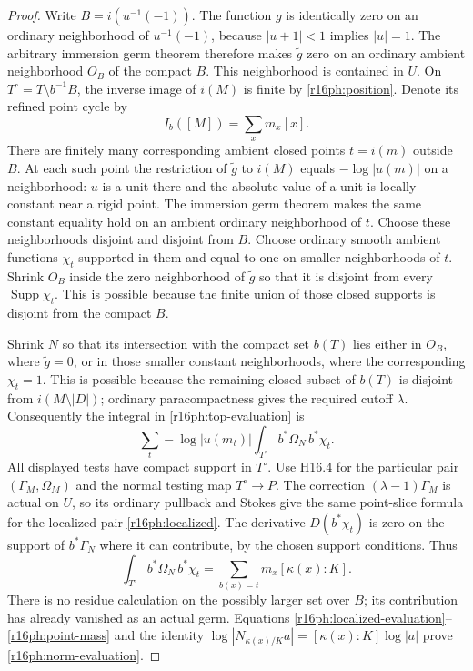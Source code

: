 \begin{proof}
Write $B=i(u^{-1}(-1))$.  The function $g$ is identically zero
on an ordinary neighborhood of $u^{-1}(-1)$, because
$|u+1|<1$ implies $|u|=1$.  The arbitrary immersion germ theorem
therefore makes $\widetilde g$ zero on an ordinary ambient
neighborhood $O_B$ of the compact $B$.  This neighborhood is
contained in $U$.  On
$T^\circ=T\setminus b^{-1}B$, the inverse image of $i(M)$
is finite by \eqref{r16ph:position}.  Denote its refined point
cycle by
\[
                         I_b([M])=\sum_x m_x[x].
 \tag{PH16.6}\label{r16ph:points}
\]
There are finitely many corresponding ambient closed points
$t=i(m)$ outside $B$.  At each such point the restriction of
$\widetilde g$ to $i(M)$ equals $-\log|u(m)|$ on a neighborhood:
$u$ is a unit there and the absolute value of a unit is locally
constant near a rigid point.  The immersion germ theorem makes
the same constant equality hold on an ambient ordinary neighborhood
of $t$.  Choose these neighborhoods disjoint and disjoint from $B$.
Choose ordinary smooth ambient functions $\chi_t$ supported in
them and equal to one on smaller neighborhoods of $t$.
Shrink $O_B$ inside the zero neighborhood of $\widetilde g$ so
that it is disjoint from every $\operatorname{Supp}\chi_t$.
This is possible because the finite union of those closed
supports is disjoint from the compact $B$.

Shrink $N$ so that its intersection with the compact set $b(T)$
lies either in $O_B$, where $\widetilde g=0$, or in those smaller
constant neighborhoods, where the corresponding $\chi_t=1$.
This is possible because the remaining closed subset of $b(T)$
is disjoint from $i(M\setminus|D|)$; ordinary paracompactness
gives the required cutoff $\lambda$.  Consequently the integral
in \eqref{r16ph:top-evaluation} is
\[
       \sum_t -\log|u(m_t)|
                       \int_{T^\circ}b^*\Omega_N\,b^*\chi_t.
 \tag{PH16.7}\label{r16ph:localized-evaluation}
\]
All displayed tests have compact support in $T^\circ$.
Use H16.4 for the particular pair $(\Gamma_M,\Omega_M)$
and the normal testing map $T^\circ\to P$.  The correction
$(\lambda-1)\Gamma_M$ is actual on $U$, so its ordinary pullback
and Stokes give the same point-slice formula for the localized
pair \eqref{r16ph:localized}.
The derivative $D(b^*\chi_t)$ is zero on the support of
$b^*\Gamma_N$ where it can contribute, by the chosen support
conditions.  Thus
\[
           \int_{T^\circ}b^*\Omega_N\,b^*\chi_t
                     =\sum_{b(x)=t}m_x[\kappa(x):K].
 \tag{PH16.8}\label{r16ph:point-mass}
\]
There is no residue calculation on the possibly larger set over
$B$; its contribution has already vanished as an actual germ.
Equations \eqref{r16ph:localized-evaluation}--\eqref{r16ph:point-mass}
and the identity
$\log|N_{\kappa(x)/K}a|=[\kappa(x):K]\log|a|$
prove \eqref{r16ph:norm-evaluation}.


\end{proof}
